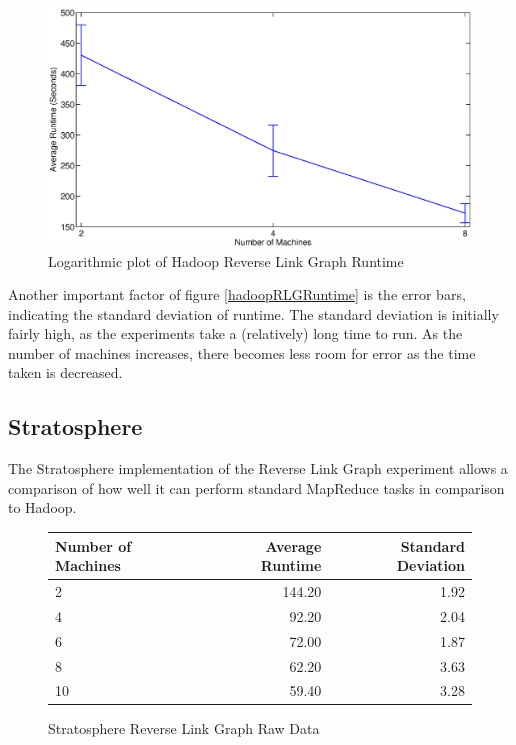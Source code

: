 \begin{figure}[H]
	\centering
	\includegraphics[scale=0.6]{resources/HadoopRLGScalability.eps}
	\caption{Logarithmic plot of Hadoop Reverse Link Graph Runtime}
	\label{hadoopRLGScalability}
\end{figure}

Another important factor of figure \ref{hadoopRLGRuntime} is the error bars, indicating the standard deviation of runtime. The standard deviation is initially fairly high, as the experiments take a (relatively) long time to run. As the number of machines increases, there becomes less room for error as the time taken is decreased. 

\subsection{Stratosphere}
The Stratosphere implementation of the Reverse Link Graph experiment allows a comparison of how well it can perform standard MapReduce tasks in comparison to Hadoop. 

\begin{figure}[H]
\centering
	\begin{tabular}{lrr}
		\toprule
		Number of Machines & Average Runtime & Standard Deviation \\
		\midrule

		2 & 144.20 & 1.92 \\
		4 & 92.20 & 2.04 \\
		6 & 72.00 & 1.87 \\
		8 & 62.20 & 3.63 \\
		10 & 59.40 & 3.28 \\
		\bottomrule
	\end{tabular}
	\caption{Stratosphere Reverse Link Graph Raw Data}
\end{figure}

